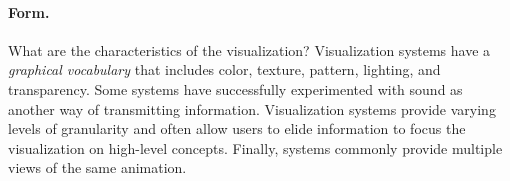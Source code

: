 
\paragraph{Form.} What are the characteristics of the visualization?
Visualization systems have a \emph{graphical vocabulary} that includes color,
texture, pattern, lighting, and transparency. Some systems have successfully
experimented with sound as another way of transmitting information.
Visualization systems provide varying levels of granularity and often allow
users to elide information to focus the visualization on high-level concepts.
Finally, systems commonly provide multiple views of the same animation.


